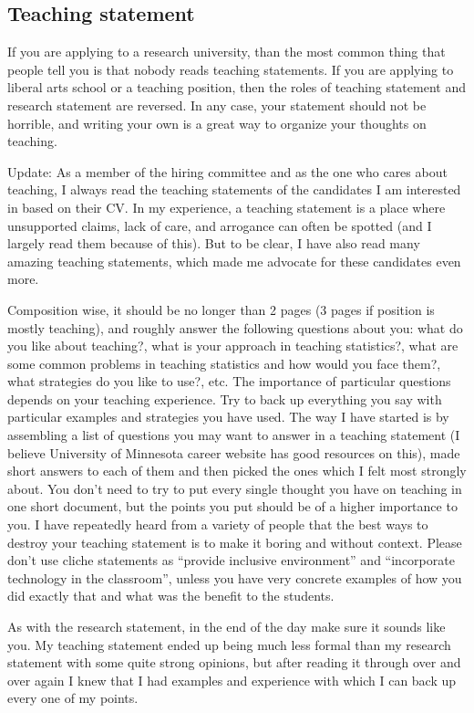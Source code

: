 \documentclass{article}
\begin{document}
\subsection{Teaching statement}

If you are applying to a research university, than the most common thing that people tell you is that nobody reads teaching statements. If you are applying to liberal arts school or a teaching position, then the roles of teaching statement and research statement are reversed. In any case, your statement should not be horrible, and writing your own is a great way to organize your thoughts on teaching. 

{\color{red} Update: As a member of the hiring committee and as the one who cares about teaching, I always read the teaching statements of the candidates I am interested in based on their CV. In my experience, a teaching statement is a place where unsupported claims, lack of care, and arrogance can often be spotted (and I largely read them because of this). But to be clear, I have also read many amazing teaching statements, which made me advocate for these candidates even more.} 

Composition wise, it should be no longer than 2 pages (3 pages if position is mostly teaching), and roughly answer the following questions about you: what do you like about teaching?, what is your approach in teaching statistics?, what are some common problems in teaching statistics and how would you face them?, what strategies do you like to use?, etc. The importance of particular questions depends on your teaching experience. Try to back up everything you say with particular examples and strategies you have used. The way I have started is by assembling a list of questions you may want to answer in a teaching statement (I believe University of Minnesota career website has good resources on this), made short answers to each of them and then picked the ones which I felt most strongly about. You don't need to try to put every single thought you have on teaching in one short document, but the points you put should be of a higher importance to you. I have repeatedly heard from a variety of people that the best ways to destroy your teaching statement is to make it boring and without context. Please don't use cliche statements as ``provide inclusive environment'' and ``incorporate technology in the classroom'', unless you have very concrete examples of how you did exactly that and what was the benefit to the students.

As with the research statement, in the end of the day make sure it sounds like you. My teaching statement ended up being much less formal than my research statement with some quite strong opinions, but after reading it through over and over again I knew that I had examples and experience with which I can back up every one of my points.
\end{document}
